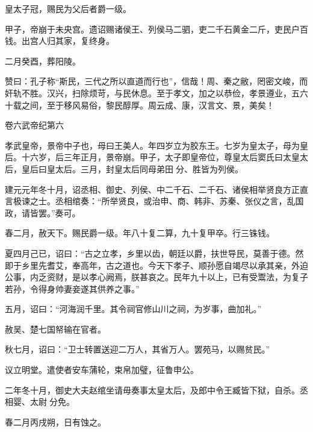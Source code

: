 \documentclass[12pt,UTF8]{ctexbook}
\begin{document}
皇太子冠，赐民为父后者爵一级。



甲子，帝崩于未央宫。遗诏赐诸侯王、列侯马二驷，吏二千石黄金二斤，吏民户百钱。出宫人归其家，复终身。



二月癸酉，葬阳陵。



赞曰：孔子称“斯民，三代之所以直道而行也”，信哉！周、秦之敝，罔密文峻，而奸轨不胜。汉兴，扫除烦苛，与民休息。至于孝文，加之以恭俭，孝景遵业，五六十载之间，至于移风易俗，黎民醇厚。周云成、康，汉言文、景，美矣！





卷六武帝纪第六



孝武皇帝，景帝中子也，母曰王美人。年四岁立为胶东王。七岁为皇太子，母为皇后。十六岁，后三年正月，景帝崩。甲子，太子即皇帝位，尊皇太后窦氏曰太皇太后，皇后曰皇太后。三月，封皇太后同母弟田分、胜皆为列侯。



建元元年冬十月，诏丞相、御史、列侯、中二千石、二千石、诸侯相举贤良方正直言极谏之士。丞相绾奏：“所举贤良，或治申、商、韩非、苏秦、张仪之言，乱国政，请皆罢。”奏可。



春二月，赦天下。赐民爵一级。年八十复二算，九十复甲卒。行三铢钱。



夏四月己已，诏曰：“古之立孝，乡里以齿，朝廷以爵，扶世导民，莫善于德。然即于乡里先耆艾，奉高年，古之道也。今天下孝子、顺孙愿自竭尽以承其亲，外迫公事，内乏资财，是以孝心阙焉，朕甚哀之。民年九十以上，已有受鬻法，为复子若孙，令得身帅妻妾遂其供养之事。”



五月，诏曰：“河海润千里。其令祠官修山川之祠，为岁事，曲加礼。”



赦吴、楚七国帑输在官者。



秋七月，诏曰：“卫士转置送迎二万人，其省万人。罢苑马，以赐贫民。”



议立明堂。遣使者安车蒲轮，束帛加璧，征鲁申公。



二年冬十月，御史大夫赵绾坐请毋奏事太皇太后，及郎中令王臧皆下狱，自杀。丞相婴、太尉分免。



春二月丙戌朔，日有蚀之。
\end{document}
